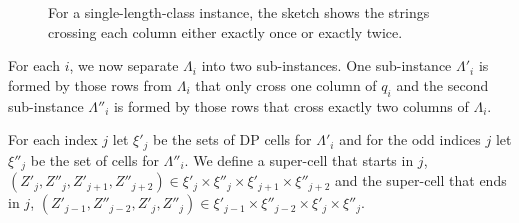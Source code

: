 \begin{figure}[h]
    \begin{center}
        \caption{\label{fig:gen_instance1} For a single-length-class instance, the sketch shows the strings crossing each column either exactly once or exactly twice.}
    \end{center}
\end{figure}

For each $i$, we now separate $\Lambda_i$ into two sub-instances.
One sub-instance $\Lambda'_i$ is formed by those rows from $\Lambda_i$ that only cross one column of $q_i$ and the second sub-instance $\Lambda''_i$ is formed by those rows that cross exactly two columns of $\Lambda_i$.

\begin{definition}
    For each index $j$ let $\xi'_j$ be the sets of DP cells for $\Lambda'_i$ and for the odd indices $j$ let $\xi''_j$ be the set of cells for $\Lambda''_i$.
    We define a super-cell that starts in $j$, $(Z'_j,Z''_j,Z'_{j+1},Z''_{j+2}) \in \xi'_j \times \xi''_j \times \xi'_{j+1} \times \xi''_{j+2}$ and the super-cell that ends in $j$, $(Z'_{j-1},Z''_{j-2},Z'_j,Z''_j) \in \xi'_{j-1} \times \xi''_{j-2} \times \xi'_{j} \times \xi''_{j}$.
    \label{def:dp-whole-length-class}
\end{definition}


